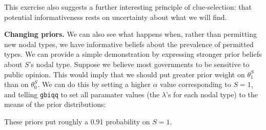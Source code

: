 \documentclass[
  12pt,
]{book}
\newenvironment{Shaded}{\begin{snugshade}}{\end{snugshade}}
\newcommand{\CommentTok}[1]{\textcolor[rgb]{0.56,0.35,0.01}{\textit{#1}}}
\newcommand{\DataTypeTok}[1]{\textcolor[rgb]{0.13,0.29,0.53}{#1}}
\newcommand{\DecValTok}[1]{\textcolor[rgb]{0.00,0.00,0.81}{#1}}
\newcommand{\KeywordTok}[1]{\textcolor[rgb]{0.13,0.29,0.53}{\textbf{#1}}}
\newcommand{\NormalTok}[1]{#1}
\newcommand{\OperatorTok}[1]{\textcolor[rgb]{0.81,0.36,0.00}{\textbf{#1}}}
\newcommand{\StringTok}[1]{\textcolor[rgb]{0.31,0.60,0.02}{#1}}
\begin{document}
This exercise also suggests a further interesting principle of clue-selection: that potential informativeness rests on uncertainty about what we will find.

\textbf{Changing priors.} We can also see what happens when, rather than permitting new nodal types, we have informative beliefs about the prevalence of permitted types. We can provide a simple demonstration by expressing stronger prior beliefs about \(S\)'s nodal type. Suppose we believe most governments to be sensitive to public opinion. This would imply that we should put greater prior weight on \(\theta^S_1\) than on \(\theta^S_0\). We can do this by setting a higher \(\alpha\) value corresponding to \(S=1\), and telling \texttt{gbiqq} to set all paramater values (the \(\lambda\)'s for each nodal type) to the means of the prior distributions:

\begin{Shaded}
\end{Shaded}

These priors put roughly a 0.91 probability on \(S=1\).
\end{document}

